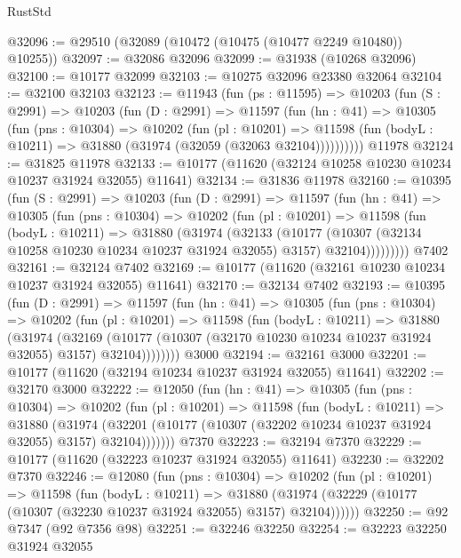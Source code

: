 \begin{lexlean}{RustStd}
\begin{coremodule}
@32096 := @29510 (@32089 (@10472 (@10475 (@10477 @2249 @10480)) @10255))
@32097 := @32086 @32096
@32099 := @31938 (@10268 @32096)
@32100 := @10177 @32099
@32103 := @10275 @32096 @23380 @32064
@32104 := @32100 @32103
@32123 := @11943
    (fun (ps : @11595) =>
    @10203
      (fun (S : @2991) =>
      @10203
        (fun (D : @2991) =>
        @11597
          (fun (hn : @41) =>
          @10305
            (fun (pns : @10304) =>
            @10202
              (fun (pl : @10201) =>
              @11598 (fun (bodyL : @10211) => @31880 (@31974 (@32059 (@32063 @32104))))))))))
    @11978
@32124 := @31825 @11978
@32133 := @10177 (@11620 (@32124 @10258 @10230 @10234 @10237 @31924 @32055) @11641)
@32134 := @31836 @11978
@32160 := @10395
    (fun (S : @2991) =>
    @10203
      (fun (D : @2991) =>
      @11597
        (fun (hn : @41) =>
        @10305
          (fun (pns : @10304) =>
          @10202
            (fun (pl : @10201) =>
            @11598
              (fun (bodyL : @10211) =>
              @31880
                (@31974
                  (@32133
                    (@10177
                      (@10307 (@32134 @10258 @10230 @10234 @10237 @31924 @32055) @3157)
                      @32104)))))))))
    @7402
@32161 := @32124 @7402
@32169 := @10177 (@11620 (@32161 @10230 @10234 @10237 @31924 @32055) @11641)
@32170 := @32134 @7402
@32193 := @10395
    (fun (D : @2991) =>
    @11597
      (fun (hn : @41) =>
      @10305
        (fun (pns : @10304) =>
        @10202
          (fun (pl : @10201) =>
          @11598
            (fun (bodyL : @10211) =>
            @31880
              (@31974
                (@32169
                  (@10177 (@10307 (@32170 @10230 @10234 @10237 @31924 @32055) @3157) @32104))))))))
    @3000
@32194 := @32161 @3000
@32201 := @10177 (@11620 (@32194 @10234 @10237 @31924 @32055) @11641)
@32202 := @32170 @3000
@32222 := @12050
    (fun (hn : @41) =>
    @10305
      (fun (pns : @10304) =>
      @10202
        (fun (pl : @10201) =>
        @11598
          (fun (bodyL : @10211) =>
          @31880
            (@31974
              (@32201 (@10177 (@10307 (@32202 @10234 @10237 @31924 @32055) @3157) @32104)))))))
    @7370
@32223 := @32194 @7370
@32229 := @10177 (@11620 (@32223 @10237 @31924 @32055) @11641)
@32230 := @32202 @7370
@32246 := @12080
    (fun (pns : @10304) =>
    @10202
      (fun (pl : @10201) =>
      @11598
        (fun (bodyL : @10211) =>
        @31880 (@31974 (@32229 (@10177 (@10307 (@32230 @10237 @31924 @32055) @3157) @32104))))))
@32250 := @92 @7347 (@92 @7356 @98)
@32251 := @32246 @32250
@32254 := @32223 @32250 @31924 @32055

\end{coremodule}
\end{lexlean}
